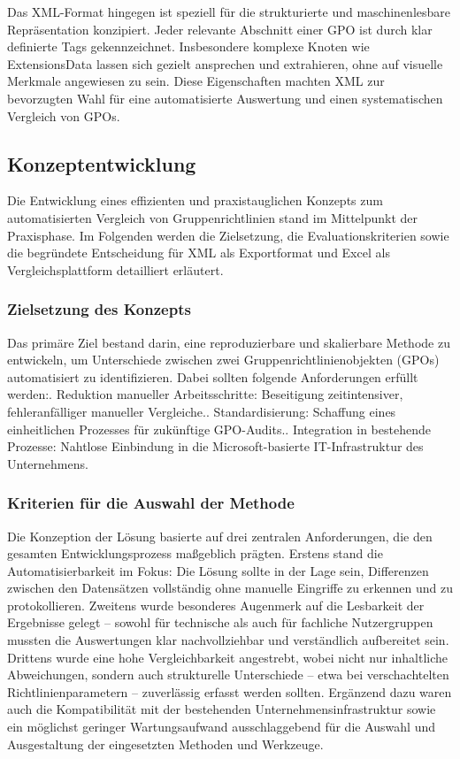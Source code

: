 Das XML-Format hingegen ist speziell für die strukturierte und maschinenlesbare Repräsentation konzipiert. Jeder relevante Abschnitt einer GPO ist durch klar definierte Tags gekennzeichnet. Insbesondere komplexe Knoten wie ExtensionsData lassen sich gezielt ansprechen und extrahieren, ohne auf visuelle Merkmale angewiesen zu sein. Diese Eigenschaften machten XML zur bevorzugten Wahl für eine automatisierte Auswertung und einen systematischen Vergleich von GPOs. 
\newpage
\subsection{Konzeptentwicklung}
    Die Entwicklung eines effizienten und praxistauglichen Konzepts zum automatisierten Vergleich von Gruppenrichtlinien stand im Mittelpunkt der Praxisphase. Im Folgenden werden die Zielsetzung, die Evaluationskriterien sowie die begründete Entscheidung für XML als Exportformat und Excel als Vergleichsplattform detailliert erläutert. 
\subsubsection{Zielsetzung des Konzepts}
    Das primäre Ziel bestand darin, eine reproduzierbare und skalierbare Methode zu entwickeln, um Unterschiede zwischen zwei Gruppenrichtlinienobjekten (GPOs) automatisiert zu identifizieren. Dabei sollten folgende Anforderungen erfüllt werden:. Reduktion manueller Arbeitsschritte: Beseitigung zeitintensiver, fehleranfälliger manueller Vergleiche.. Standardisierung: Schaffung eines einheitlichen Prozesses für zukünftige GPO-Audits.. Integration in bestehende Prozesse: Nahtlose Einbindung in die Microsoft-basierte IT-Infrastruktur des Unternehmens. 
\subsubsection{Kriterien für die Auswahl der Methode}
    Die Konzeption der Lösung basierte auf drei zentralen Anforderungen, die den gesamten Entwicklungsprozess maßgeblich prägten.\newline
    Erstens stand die Automatisierbarkeit im Fokus: Die Lösung sollte in der Lage sein, Differenzen zwischen den Datensätzen vollständig ohne manuelle Eingriffe zu erkennen und zu protokollieren. Zweitens wurde besonderes Augenmerk auf die Lesbarkeit der Ergebnisse gelegt – sowohl für technische als auch für fachliche Nutzergruppen mussten die Auswertungen klar nachvollziehbar und verständlich aufbereitet sein. Drittens wurde eine hohe Vergleichbarkeit angestrebt, wobei nicht nur inhaltliche Abweichungen, sondern auch strukturelle Unterschiede – etwa bei verschachtelten Richtlinienparametern – zuverlässig erfasst werden sollten.\newline
    Ergänzend dazu waren auch die Kompatibilität mit der bestehenden Unternehmensinfrastruktur sowie ein möglichst geringer Wartungsaufwand ausschlaggebend für die Auswahl und Ausgestaltung der eingesetzten Methoden und Werkzeuge.
